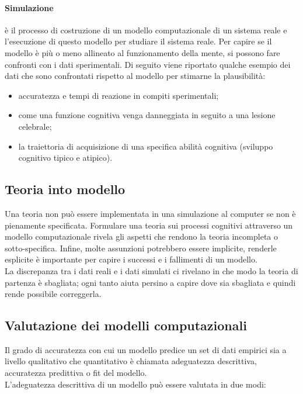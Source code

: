 \paragraph{Simulazione} è il processo di costruzione di un modello computazionale
di un sistema reale e l'esecuzione di questo modello per studiare il sistema
reale. Per capire se il modello è più o meno allineato al funzionamento della
mente, si possono fare confronti con i dati sperimentali. Di seguito viene
riportato qualche esempio dei dati che sono confrontati rispetto al modello per
stimarne la plausibilità:
\begin{itemize}
	\item accuratezza e tempi di reazione in compiti sperimentali;

	\item come una funzione cognitiva venga danneggiata in seguito a una lesione
		celebrale;

	\item la traiettoria di acquisizione di una specifica abilità cognitiva
		(sviluppo cognitivo tipico e atipico).
\end{itemize}

\subsection{Teoria into modello}

Una teoria non può essere implementata in una simulazione al computer se non è
pienamente specificata. Formulare una teoria sui processi cognitivi attraverso
un modello computazionale rivela gli aspetti che rendono la teoria incompleta o
sotto-specifica. Infine, molte assunzioni potrebbero essere implicite, renderle
esplicite è importante per capire i successi e i fallimenti di un modello.\\
La discrepanza tra i dati reali e i dati simulati ci rivelano in che modo la
teoria di partenza è sbagliata; ogni tanto aiuta persino a capire dove sia
sbagliata e quindi rende possibile correggerla.

\subsection{Valutazione dei modelli computazionali}

Il grado di accuratezza con cui un modello predice un set di dati empirici sia a
livello qualitativo che quantitativo è chiamata adeguatezza descrittiva,
accuratezza predittiva o fit del modello.\\
L'adeguatezza descrittiva di un modello può essere valutata in due modi:

